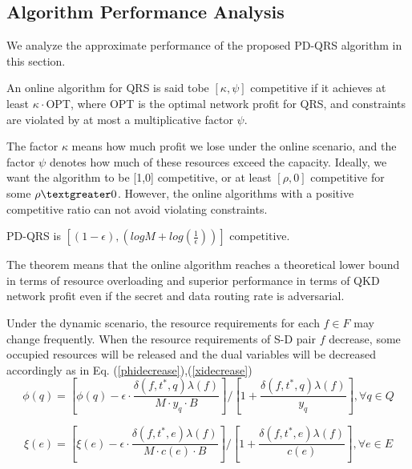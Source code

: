 \subsection{Algorithm Performance Analysis}
We analyze the approximate performance of the proposed PD-QRS algorithm in this section.

\begin{definition}
An online algorithm for QRS is said tobe $[\kappa,\psi]$ competitive if it achieves at least $\kappa \cdot$OPT, where OPT is the optimal network profit for QRS, and constraints are violated by at most a multiplicative factor $\psi$.
\end{definition}

The factor $\kappa$ means how much profit we lose under the online scenario, and the factor $\psi$ denotes how much of these resources exceed the capacity. Ideally, we want the algorithm to be [1,0] competitive, or at least $[\rho,0]$ competitive for some $\rho \textgreater 0$. However, the online algorithms with a positive competitive ratio can not avoid violating constraints.

\begin{theorem}
  PD-QRS is $[(1-\epsilon),(logM + log(\frac{1}{\epsilon}))]$ competitive.
\end{theorem}

The theorem means that the online algorithm reaches a theoretical lower bound in terms of resource overloading and superior performance in terms of QKD network profit even if the secret and data routing rate is adversarial.

Under the dynamic scenario, the resource requirements for each $f \in F$ may change frequently.  When the resource requirements of S-D pair $f$ decrease, some occupied resources will be released and the dual variables will be decreased accordingly as in Eq. (\ref{phidecrease}),(\ref{xidecrease})
\begin{equation}
    \phi(q) = [\phi(q)-\epsilon \cdot \frac{\delta(f,t^*,q)\lambda(f)}{M \cdot y_q \cdot B}]/[1+\frac{\delta(f,t^*,q)\lambda(f)}{y_q}], \forall q \in Q
    \label{phidecrease}
\end{equation}


\begin{equation}
    \xi(e) = [\xi(e)-\epsilon \cdot \frac{\delta(f,t^*,e)\lambda(f)}{M \cdot c(e)\cdot B}]/[1+\frac{\delta(f,t^*,e)\lambda(f)}{c(e)}], \forall e \in E
    \label{xidecrease}
\end{equation}

